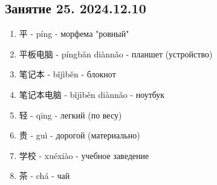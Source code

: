 \LARGE
\newpage
\subsection{Занятие 25. 2024.12.10}
\begin{newwords}
	\begin{enumerate}\hfill
		\item 平 - píng - морфема "ровный"
		\item 平板电脑 - píngbǎn diànnǎo - планшет (устройство)
		\item 笔记本 - bǐjìběn - блокнот
		\item 笔记本电脑 - bǐjìběn diànnǎo - ноутбук
		\item 轻 - qīng - легкий (по весу)
		\item 贵 - guì - дорогой (материально)
		\item 学校 - xuéxiào - учебное заведение
		\item 茶 - chá - чай
	\end{enumerate}
\end{newwords}